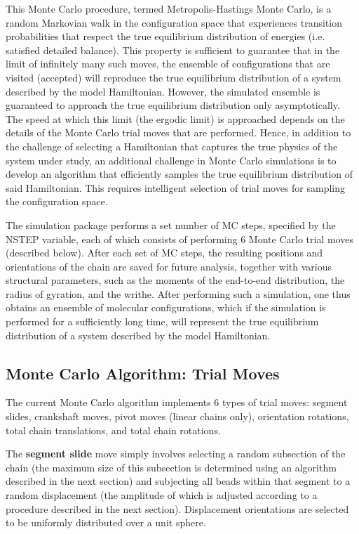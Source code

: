 \documentclass[english]{article}
\begin{document}
This Monte Carlo procedure, termed Metropolis-Hastings Monte Carlo, is a random Markovian walk in the configuration space that experiences transition probabilities that respect the true equilibrium distribution of energies (i.e. satisfied detailed balance). This property is sufficient to guarantee that in the limit of infinitely many such moves, the ensemble of configurations that are visited (accepted) will reproduce the true equilibrium distribution of a system described by the model Hamiltonian. However, the simulated ensemble is guaranteed to approach the true equilibrium distribution only asymptotically. The speed at which this limit (the ergodic limit) is approached depends on the details of the Monte Carlo trial moves that are performed. Hence, in addition to the challenge of selecting a Hamiltonian that captures the true physics of the system under study, an additional challenge in Monte Carlo simulations is to develop an algorithm that efficiently samples the true equilibrium distribution of said Hamiltonian. This requires intelligent selection of trial moves for sampling the configuration space.

The simulation package performs a set number of MC steps, specified by the NSTEP variable, each of which consists of performing 6 Monte Carlo trial moves (described below). After each set of MC steps, the resulting positions and orientations of the chain are saved for future analysis, together with various structural parameters, such as the moments of the end-to-end distribution, the radius of gyration, and the writhe. After performing such a simulation, one thus obtains an ensemble of  molecular configurations, which if the simulation is performed for a sufficiently long time, will represent the true equilibrium distribution of a system described by the model Hamiltonian.

\subsection{Monte Carlo Algorithm: Trial Moves}

The current Monte Carlo algorithm implements 6 types of trial moves: segment slides, crankshaft moves, pivot moves (linear chains only), orientation rotations, total chain translations, and total chain rotations.

The \textbf{segment slide} move simply involves selecting a random subsection of the chain (the maximum size of this subsection is determined using an algorithm described in the next section) and subjecting all beads within that segment to a random displacement (the amplitude of which is adjusted according to a procedure described in the next section). Displacement orientations are selected to be uniformly distributed over a unit sphere.
\end{document}
